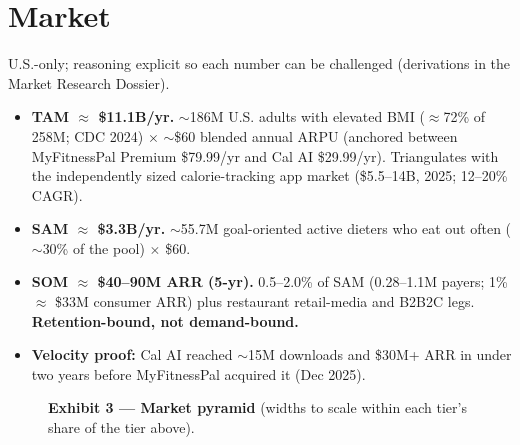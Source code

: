 \documentclass[10pt]{article}
\begin{document}
\section{Market}

{\small\color{muted}U.S.-only; reasoning explicit so each number can be challenged (derivations in the Market Research Dossier).}

\begin{itemize}[leftmargin=1.4em,itemsep=3pt]
\item \textbf{TAM $\approx$ \$11.1B/yr.} $\sim$186M U.S. adults with elevated BMI ($\approx$72\% of 258M; CDC 2024) $\times$ $\sim$\$60 blended annual ARPU (anchored between MyFitnessPal Premium \$79.99/yr and Cal AI \$29.99/yr). Triangulates with the independently sized calorie-tracking app market (\$5.5--14B, 2025; 12--20\% CAGR).
\item \textbf{SAM $\approx$ \$3.3B/yr.} $\sim$55.7M goal-oriented active dieters who eat out often ($\sim$30\% of the pool) $\times$ \$60.
\item \textbf{SOM $\approx$ \$40--90M ARR (5-yr).} 0.5--2.0\% of SAM (0.28--1.1M payers; 1\% $\approx$ \$33M consumer ARR) plus restaurant retail-media and B2B2C legs. \textbf{Retention-bound, not demand-bound.}
\item \textbf{Velocity proof:} Cal AI reached $\sim$15M downloads and \$30M+ ARR in under two years before MyFitnessPal acquired it (Dec 2025).
\end{itemize}

\begin{figure}[h]
\centering
{}
\caption*{\scriptsize\color{muted}\textbf{Exhibit 3 --- Market pyramid} (widths to scale within each tier's share of the tier above).}
\end{figure}
\end{document}
